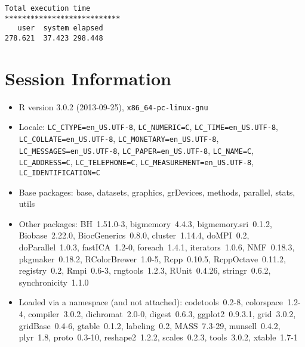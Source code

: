 \documentclass[10pt]{article}\usepackage[]{graphicx}\usepackage[]{color}
\begin{document}
\begin{verbatim}
Total execution time
***************************
   user  system elapsed 
278.621  37.423 298.448 

\end{verbatim}

\section*{Session Information}
\begin{itemize}\raggedright
  \item R version 3.0.2 (2013-09-25), \verb|x86_64-pc-linux-gnu|
  \item Locale: \verb|LC_CTYPE=en_US.UTF-8|, \verb|LC_NUMERIC=C|, \verb|LC_TIME=en_US.UTF-8|, \verb|LC_COLLATE=en_US.UTF-8|, \verb|LC_MONETARY=en_US.UTF-8|, \verb|LC_MESSAGES=en_US.UTF-8|, \verb|LC_PAPER=en_US.UTF-8|, \verb|LC_NAME=C|, \verb|LC_ADDRESS=C|, \verb|LC_TELEPHONE=C|, \verb|LC_MEASUREMENT=en_US.UTF-8|, \verb|LC_IDENTIFICATION=C|
  \item Base packages: base, datasets, graphics, grDevices, methods,
    parallel, stats, utils
  \item Other packages: BH~1.51.0-3, bigmemory~4.4.3,
    bigmemory.sri~0.1.2, Biobase~2.22.0, BiocGenerics~0.8.0,
    cluster~1.14.4, doMPI~0.2, doParallel~1.0.3, fastICA~1.2-0,
    foreach~1.4.1, iterators~1.0.6, NMF~0.18.3, pkgmaker~0.18.2,
    RColorBrewer~1.0-5, Rcpp~0.10.5, RcppOctave~0.11.2, registry~0.2,
    Rmpi~0.6-3, rngtools~1.2.3, RUnit~0.4.26, stringr~0.6.2,
    synchronicity~1.1.0
  \item Loaded via a namespace (and not attached): codetools~0.2-8,
    colorspace~1.2-4, compiler~3.0.2, dichromat~2.0-0, digest~0.6.3,
    ggplot2~0.9.3.1, grid~3.0.2, gridBase~0.4-6, gtable~0.1.2,
    labeling~0.2, MASS~7.3-29, munsell~0.4.2, plyr~1.8, proto~0.3-10,
    reshape2~1.2.2, scales~0.2.3, tools~3.0.2, xtable~1.7-1
\end{itemize}
\end{document}
